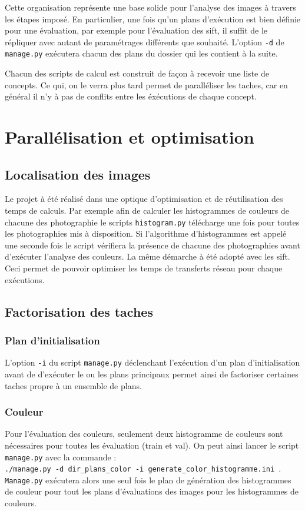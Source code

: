 \documentclass[a4paper, 11pt]{article}
\begin{document}
Cette organisation représente une base solide pour l'analyse des images à travers les étapes imposé. En particulier, une fois qu'un plans d'exécution est bien définie pour une évaluation, par exemple pour l'évaluation des sift, il suffit de le répliquer avec autant de paramétrages différents que souhaité. L'option \texttt{-d} de \texttt{manage.py} exécutera chacun des plans du dossier qui les contient à la suite.

Chacun des scripts de calcul est construit de façon à recevoir une liste de concepts. Ce qui, on le verra plus tard permet de paralléliser les taches, car en général il n'y à pas de conflits entre les éxécutions de chaque concept.   

\section{Parallélisation et optimisation}

\subsection{Localisation des images}
Le projet à été réalisé dans une optique d'optimisation et de réutilisation des temps de calculs. Par exemple afin de calculer les histogrammes de couleurs de chacune des photographie le scripts
\texttt{histogram.py} télécharge une fois pour toutes les photographies mis à disposition. Si l'algorithme d'histogrammes est appelé une seconde fois le script vérifiera la présence de chacune des photographies avant d'exécuter l'analyse des couleurs. La même démarche à été adopté avec les sift. Ceci permet de pouvoir optimiser les temps de transferts réseau pour chaque exécutions.

\subsection{Factorisation des taches}
\subsubsection{Plan d'initialisation}
L'option \texttt{-i} du script \texttt{manage.py} déclenchant l'exécution d'un plan d'initialisation avant de d'exécuter le ou les plans principaux permet ainsi de factoriser certaines taches propre à un ensemble de plans.
\subsubsection{Couleur}
Pour l'évaluation des couleurs, seulement deux histogramme de couleurs sont nécessaires pour toutes les évaluation (train et val). On peut ainsi lancer le script \texttt{manage.py} avec la commande : \\ \texttt{./manage.py -d dir\_plans\_color  -i generate\_color\_histogramme.ini }.
\\ \texttt{Manage.py} exécutera alors une seul fois le plan de génération des histogrammes de couleur pour tout les plans d'évaluations des images pour les histogrammes de couleurs.
\end{document}
